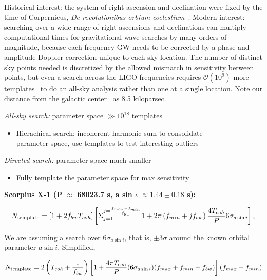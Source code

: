 Historical interest: the system of right ascension and declination were fixed by the time of Corpernicus, \textit{De revolutionibus orbium coelestium}~\cite{Hawking2002}.
Modern interest: searching over a wide range of right ascensions and declinations can multiply computational times for gravitational wave searches by many orders of magnitude, because each frequency GW needs to be corrected by a phase and amplitude Doppler correction unique to each sky location.
The number of distinct sky points needed is discretized by the allowed mismatch in sensitivity between points, but even a search across the LIGO frequencies requires $\mathcal{O}(10^9)$ more templates~\cite{GoetzTwoSpectMethods2011} to do an all-sky analysis rather than one at a single location. 
Note our distance from the galactic center~\cite{KerrLyndenBell1986} as 8.5 kiloparsec.




\emph{All-sky search: }parameter space $\gg10^{18}$ templates
\begin{itemize}
\item Hierachical search; incoherent harmonic sum to consolidate\\
parameter space, use templates to test interesting outliers
\end{itemize}

\emph{Directed search: }parameter space much smaller
\begin{itemize}
\item Fully template the parameter space for max sensitivity
\end{itemize}

\textbf{Scorpius X-1 (P $\approx$$ $ 68023.7 s, a sin $\iota$ $\approx1.44\pm0.18$
s):}


\begin{equation}
N_{\textup{{template}}}=\left[1+2f_{bw}T_{coh}\right] \left[ {\displaystyle \Sigma}_{j=1}^{j = \frac{f_{max} - f_{min}}{f_{bw}}} 1 + 2\pi\left(f_{min} + j f_{bw}\right) \frac{4 T_{coh}}{P} 6 \sigma_{a \sin i} \right],
\label{N_template_full}
\end{equation}

\noindent We are assuming a search over $6\sigma_{a \sin i}$, that is, $\pm 3 \sigma$ around the known orbital parameter $a\sin i$. Simplified,

\begin{equation}
N_{\textup{template}} = 2 \left(T_{coh} + \frac{1}{f_{bw}}\right)\left[ 1+\frac{4 \pi T_{coh}}{P} (6\sigma_{a \sin i})(f_{max} + f_{min} + f_{bw})\right] (f_{max} - f_{min})
\label{N_template_simple}
\end{equation}

